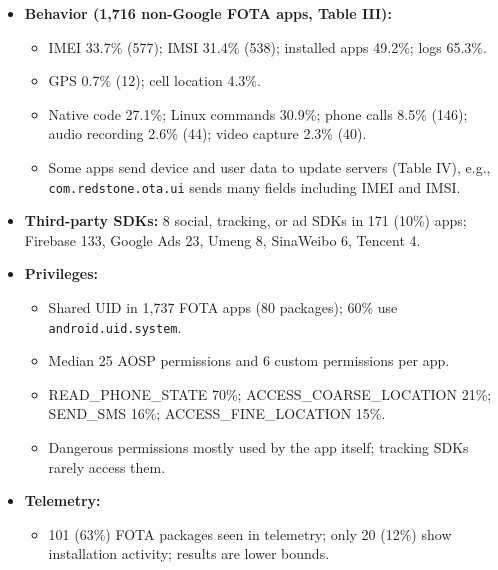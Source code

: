 \documentclass[11pt,a4paper]{article}
\begin{document}
\begin{enumerate}
\begin{itemize}[leftmargin=*,itemsep=1pt,topsep=2pt]
\begin{itemize}[itemsep=0pt]
            \item 5\% of the 1,747 devices with \texttt{otacerts.zip} include an AOSP default key (17 brands; mostly Alps 57\%, Goclever 12\%); verification becomes useless. (Discussion mentions 90 such devices.)
            \item 8\% of non-A/B FOTAs use verification with no evidence of installation; 45\% have install flags without \texttt{verifyPackage}. Of 949 not using Google's verify API, 51\% call \texttt{MessageDigest}, mostly MD5.
        \end{itemize}
        \item \textbf{Behavior (1,716 non-Google FOTA apps, Table III):}
        \begin{itemize}[itemsep=0pt]
            \item IMEI 33.7\% (577); IMSI 31.4\% (538); installed apps 49.2\%; logs 65.3\%.
            \item GPS 0.7\% (12); cell location 4.3\%.
            \item Native code 27.1\%; Linux commands 30.9\%; phone calls 8.5\% (146); audio recording 2.6\% (44); video capture 2.3\% (40).
            \item Some apps send device and user data to update servers (Table IV), e.g., \texttt{com.redstone.ota.ui} sends many fields including IMEI and IMSI.
        \end{itemize}
        \item \textbf{Third-party SDKs:} 8 social, tracking, or ad SDKs in 171 (10\%) apps; Firebase 133, Google Ads 23, Umeng 8, SinaWeibo 6, Tencent 4.
        \item \textbf{Privileges:}
        \begin{itemize}[itemsep=0pt]
            \item Shared UID in 1,737 FOTA apps (80 packages); 60\% use \texttt{android.uid.system}.
            \item Median 25 AOSP permissions and 6 custom permissions per app.
            \item READ\_PHONE\_STATE 70\%; ACCESS\_COARSE\_LOCATION 21\%; SEND\_SMS 16\%; ACCESS\_FINE\_LOCATION 15\%.
            \item Dangerous permissions mostly used by the app itself; tracking SDKs rarely access them.
        \end{itemize}
        \item \textbf{Telemetry:}
        \begin{itemize}[itemsep=0pt]
            \item 101 (63\%) FOTA packages seen in telemetry; only 20 (12\%) show installation activity; results are lower bounds.

\end{itemize}
\end{itemize}
\end{enumerate}
\end{document}
